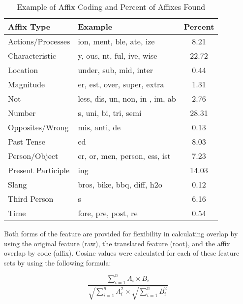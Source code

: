 \documentclass[english,,man]{apa6}
\theoremstyle{definition}
\theoremstyle{definition}
\theoremstyle{definition}
\theoremstyle{remark}
\begin{document}
\begin{table}[tbp]
\begin{center}
\begin{threeparttable}
\caption{\label{tab:affix-table}Example of Affix Coding and Percent of Affixes Found}
\begin{tabular}{llc}
\toprule
Affix Type & Example & Percent\\
\midrule
Actions/Processes & ion, ment, ble, ate, ize & 8.21\\
Characteristic & y, ous, nt, ful, ive, wise & 22.72\\
Location & under, sub, mid, inter & 0.44\\
Magnitude & er, est, over, super, extra & 1.31\\
Not & less, dis, un, non, in , im, ab & 2.76\\
Number & s, uni, bi, tri, semi & 28.31\\
Opposites/Wrong & mis, anti, de & 0.13\\
Past Tense & ed & 8.03\\
Person/Object & er, or, men, person, ess, ist & 7.23\\
Present Participle & ing & 14.03\\
Slang & bros, bike, bbq, diff, h2o & 0.12\\
Third Person & s & 6.16\\
Time & fore, pre, post, re & 0.54\\
\bottomrule
\end{tabular}
\end{threeparttable}
\end{center}
\end{table}

Both forms of the feature are provided for flexibility in calculating
overlap by using the original feature (raw), the translated feature
(root), and the affix overlap by code (affix). Cosine values were
calculated for each of these feature sets by using the following
formula:

\[
\frac{\sum_{i=1}^{n} A_i \times B_i} {\sqrt{\sum_{i=1}^{n} A_i^2} \times \sqrt{\sum_{i=1}^{n} B_i^2}}
\]
\end{document}
